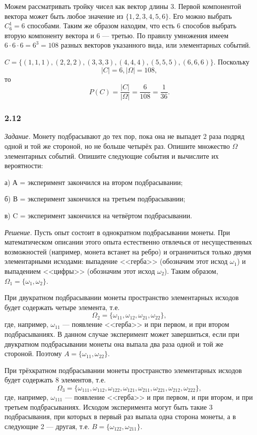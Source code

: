 \documentclass{book}
\begin{document}
Можем рассматривать тройку чисел как вектор длины 3.
Первой компонентой вектора может быть любое значение из $ \{ 1, 2, 3, 4, 5, 6 \} $.
Его можно выбрать $ C_6^1 = 6 $ способами.
Таким же образом находим, что есть 6 способов выбрать вторую компоненту вектора и 6 --- третью.
По правилу умножения имеем $ 6 \cdot 6 \cdot 6 = 6^3 = 108 $ разных векторов указанного вида, или элементарных событий.

$ C = \{ (1, 1, 1), (2, 2, 2), (3, 3, 3), (4, 4, 4), (5, 5, 5), (6, 6, 6) \} $.
Поскольку
$$ |C| = 6,
|\Omega| = 108, $$
то
$$ P(C) =
\frac{ |C| }{ |\Omega| } =
\frac{ 6 }{ 108 } =
\frac{ 1 }{ 36 }.$$

\subsubsection*{2.12}

\textit{Задание.} Монету подбрасывают до тех пор, пока она не выпадет 2 раза подряд одной и той же стороной, но не больше четырёх раз.
Опишите множество $ \Omega $ элементарных событий.
Опишите следующие события и вычислите их вероятности:

а) А = { эксперимент закончился на втором подбрасывании};

б) В = { эксперимент закончился на третьем подбрасывании};

в) C = { эксперимент закончился на четвёртом подбрасывании}.

\textit{Решение.}  Пусть опыт состоит в однократном подбрасывании монеты.
При математическом описании этого опыта естественно отвлечься от несущественных возможностей
(например, монета встанет на ребро) и ограничиться только двумя элементарными исходами:
выпадение <<герба>> (обозначим этот исход $ \omega_1 $) и выпадением <<цифры>> (обозначим этот исход $ \omega_2 $).
Таким образом, $ \Omega_1 = \{ \omega_1, \omega_2 \} $.

При двукратном подбрасывании монеты пространство элементарных исходов будет содержать четыре элемента, т.е.
$$ \Omega_2 = \{ \omega_{11}, \omega_{12}, \omega_{21}, \omega_{22} \},$$
где, например, $ \omega_{11} $ --- появление <<герба>> и при первом, и при втором подбрасываниях.
В данном случае эксперимент может завершиться, если при двукратном подбрасывании монеты она выпала два раза одной и той же стороной.
Поэтому $ A = \{ \omega_{11}, \omega_{22} \} $.

При трёхкратном подбрасывании монеты пространство элементарных исходов будет содержать 8 элементов, т.е.
$$ \Omega_3 =
\{ \omega_{111}, \omega_{112}, \omega_{122}, \omega_{121}, \omega_{211}, \omega_{221}, \omega_{212}, \omega_{222} \},$$
где, например, $ \omega_{111} $ --- появление <<герба>> и при первом, и при втором, и при третьем подбрасываниях.
Исходом эксперимента могут быть такие 3 подбрасывания, при которых в первый раз выпала одна сторона монеты, а в следующие 2 --- другая, т.е.
$ B = \{ \omega_{122}, \omega_{211} \} $.
\end{document}
